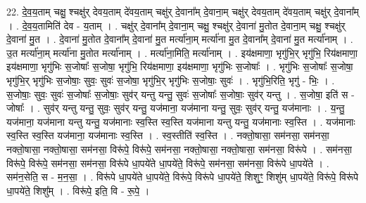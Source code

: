 \documentclass[17pt]{extarticle}
\begin{document}
22. दे॒व॒य॒ताम् चक्षु॒ श्चक्षु॑र् देवय॒ताम् दे॑वय॒ताम् चक्षु॑र् दे॒वाना᳚म् दे॒वाना॒म् चक्षु॑र् देवय॒ताम् दे॑वय॒ताम् चक्षु॑र् दे॒वाना᳚म् । . दे॒व॒य॒तामिति॑ देव - य॒ताम् । . चक्षु॑र् दे॒वाना᳚म् दे॒वाना॒म् चक्षु॒ श्चक्षु॑र् दे॒वाना॑ मु॒तोत दे॒वाना॒म् चक्षु॒ श्चक्षु॑र् दे॒वाना॑ मु॒त । . दे॒वाना॑ मु॒तोत दे॒वाना᳚म् दे॒वाना॑ मु॒त मर्त्या॑ना॒म् मर्त्या॑ना मु॒त दे॒वाना᳚म् दे॒वाना॑ मु॒त मर्त्या॑नाम् । . उ॒त मर्त्या॑ना॒म् मर्त्या॑ना मु॒तोत मर्त्या॑नाम् । . मर्त्या॑ना॒मिति॒ मर्त्या॑नाम् । . इय॑क्षमाणा॒ भृगु॑भि॒र् भृगु॑भि॒ रिय॑क्षमाणा॒ इय॑क्षमाणा॒ भृगु॑भिः स॒जोषाः᳚ स॒जोषा॒ भृगु॑भि॒ रिय॑क्षमाणा॒ इय॑क्षमाणा॒ भृगु॑भिः स॒जोषाः᳚ । . भृगु॑भिः स॒जोषाः᳚ स॒जोषा॒ भृगु॑भि॒र् भृगु॑भिः स॒जोषाः॒ सुवः॒ सुवः॑ स॒जोषा॒ भृगु॑भि॒र् भृगु॑भिः स॒जोषाः॒ सुवः॑ । . भृगु॑भि॒रिति॒ भृगु॑ - भिः॒ । . स॒जोषाः॒ सुवः॒ सुवः॑ स॒जोषाः᳚ स॒जोषाः॒ सुव॑र् यन्तु यन्तु॒ सुवः॑ स॒जोषाः᳚ स॒जोषाः॒ सुव॑र् यन्तु । . स॒जोषा॒ इति॑ स - जोषाः᳚ । . सुव॑र् यन्तु यन्तु॒ सुवः॒ सुव॑र् यन्तु॒ यज॑माना॒ यज॑माना यन्तु॒ सुवः॒ सुव॑र् यन्तु॒ यज॑मानाः । . य॒न्तु॒ यज॑माना॒ यज॑माना यन्तु यन्तु॒ यज॑मानाः स्व॒स्ति स्व॒स्ति यज॑माना यन्तु यन्तु॒ यज॑मानाः स्व॒स्ति । . यज॑मानाः स्व॒स्ति स्व॒स्ति यज॑माना॒ यज॑मानाः स्व॒स्ति । . स्व॒स्तीति॑ स्व॒स्ति । . नक्तो॒षासा॒ सम॑नसा॒ सम॑नसा॒ नक्तो॒षासा॒ नक्तो॒षासा॒ सम॑नसा॒ विरू॑पे॒ विरू॑पे॒ सम॑नसा॒ नक्तो॒षासा॒ नक्तो॒षासा॒ सम॑नसा॒ विरू॑पे । . सम॑नसा॒ विरू॑पे॒ विरू॑पे॒ सम॑नसा॒ सम॑नसा॒ विरू॑पे धा॒पये॑ते धा॒पये॑ते॒ विरू॑पे॒ सम॑नसा॒ सम॑नसा॒ विरू॑पे धा॒पये॑ते । . सम॑न॒सेति॒ स - म॒न॒सा॒ । . विरू॑पे धा॒पये॑ते धा॒पये॑ते॒ विरू॑पे॒ विरू॑पे धा॒पये॑ते॒ शिशुꣳ॒॒ शिशु॑म् धा॒पये॑ते॒ विरू॑पे॒ विरू॑पे धा॒पये॑ते॒ शिशु᳚म् । . विरू॑पे॒ इति॒ वि - रू॒पे॒ । \newline
\end{document}
